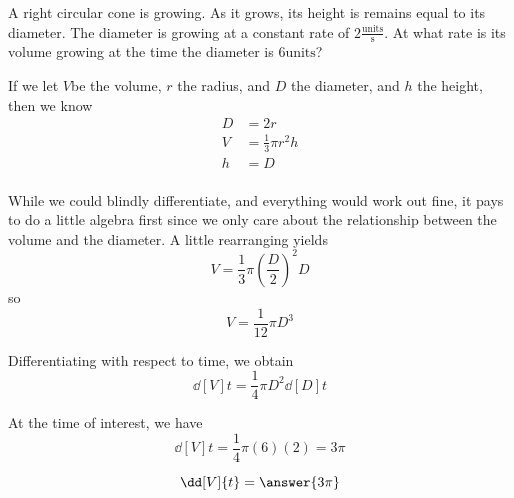\documentclass{ximera}
\author{Steven Gubkin}
\begin{document}
\begin{exercise}



A right circular cone is growing.  As it grows, its height is remains
equal to its diameter. The diameter is growing at a constant rate of
$2 \frac{\textrm{units}}{\textrm{s}}$. At what rate is its volume
growing at the time the diameter is $6 \textrm{units}$?


\begin{hint}
  If we let $V$be the volume, $r$ the radius, and $D$ the diameter,  and $h$ the height, then we know
\begin{align*}
	D &= 2r\\
	V &= \frac{1}{3} \pi r^2 h\\
	h &= D\\
\end{align*}
\end{hint}

\begin{hint}
  While we could blindly differentiate, and everything would work out
  fine, it pays to do a little algebra first since we only care about
  the relationship between the volume and the diameter.  A little
  rearranging yields
\[
V = \frac{1}{3} \pi \left(\frac{D}{2}\right)^2D
\]
so
\[
V = \frac{1}{12} \pi D^3
\]
\end{hint}

\begin{hint}
  Differentiating with respect to time, we obtain
  \[
  \dd[V]{t} = \frac{1}{4} \pi D^2 \dd[D]{t}
  \]
\end{hint}

\begin{hint}
  At the time of interest, we have
  \[
  \dd[V]{t} = \frac{1}{4} \pi (6) (2) = 3\pi
  \]
\end{hint}

\begin{prompt}
  \[
  \dd[V]{t} = \answer{3\pi}
  \]
\end{prompt}

\end{exercise}
\end{document}
